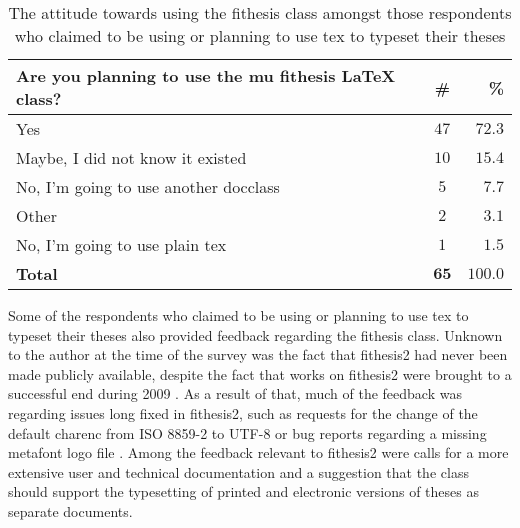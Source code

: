 \begin{table}
  \caption{The attitude towards using the fithesis class amongst those respondents who claimed to be using or planning to use \gls{tex} to typeset their theses}
  \begin{tabularx}{\textwidth}{Xcr}
    \textbf{Are you planning to use the \gls{mu} fithesis \LaTeX{} class?} & \textbf{\#} & \textbf{\%} \\
    \hline
    Yes                                         & $47$          & $72.3$ \\
    Maybe, I did not know it existed            & $10$          & $15.4$ \\
    No, I'm going to use another \gls{docclass} & $5$           &  $7.7$ \\
    Other                                       & $2$           &  $3.1$ \\
    No, I'm going to use plain \gls{tex}        & $1$           &  $1.5$ \\
    \hline
    \textbf{Total}                              & $\mathbf{65}$ & $\mathbf{100.0}$
  \end{tabularx}
  \label{table:survey-tex}
\end{table}

Some of the respondents who claimed to be using or planning to use \gls{tex} to typeset their theses also provided feedback regarding the fithesis class. Unknown to the author at the time of the survey was the fact that fithesis2 had never been made publicly available, despite the fact that works on fithesis2 were brought to a successful end during 2009 \cite{Filipcik09}. As a result of that, much of the feedback was regarding issues long fixed in fithesis2, such as requests for the change of the default \gls{charenc} from ISO 8859-2 to UTF-8 \cite[section~4.1]{Filipcik09} or bug reports regarding a missing metafont logo file \cite{fithesis2@fbd7a25}. Among the feedback relevant to fithesis2 were calls for a more extensive user and technical documentation\pending{} and a suggestion that the class should support the typesetting of printed and electronic versions of theses as separate documents\pending{}.
